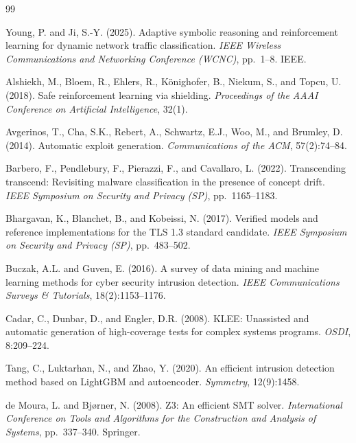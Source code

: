 \documentclass[12pt, letterpaper, oneside]{report}
\begin{document}

\begin{thebibliography}{99}

Young, P. and Ji, S.-Y. (2025).
Adaptive symbolic reasoning and reinforcement learning for dynamic network traffic classification.
\textit{IEEE Wireless Communications and Networking Conference (WCNC)}, pp.\ 1--8. IEEE.

Alshiekh, M., Bloem, R., Ehlers, R., K{\"o}nighofer, B., Niekum, S., and Topcu, U. (2018).
Safe reinforcement learning via shielding.
\textit{Proceedings of the AAAI Conference on Artificial Intelligence}, 32(1).

Avgerinos, T., Cha, S.K., Rebert, A., Schwartz, E.J., Woo, M., and Brumley, D. (2014).
Automatic exploit generation.
\textit{Communications of the ACM}, 57(2):74--84.

Barbero, F., Pendlebury, F., Pierazzi, F., and Cavallaro, L. (2022).
Transcending transcend: Revisiting malware classification in the presence of concept drift.
\textit{IEEE Symposium on Security and Privacy (SP)}, pp.\ 1165--1183.

Bhargavan, K., Blanchet, B., and Kobeissi, N. (2017).
Verified models and reference implementations for the TLS 1.3 standard candidate.
\textit{IEEE Symposium on Security and Privacy (SP)}, pp.\ 483--502.

Buczak, A.L. and Guven, E. (2016).
A survey of data mining and machine learning methods for cyber security intrusion detection.
\textit{IEEE Communications Surveys \& Tutorials}, 18(2):1153--1176.

Cadar, C., Dunbar, D., and Engler, D.R. (2008).
KLEE: Unassisted and automatic generation of high-coverage tests for complex systems programs.
\textit{OSDI}, 8:209--224.

Tang, C., Luktarhan, N., and Zhao, Y. (2020).
An efficient intrusion detection method based on LightGBM and autoencoder.
\textit{Symmetry}, 12(9):1458.

de Moura, L. and Bj{\o}rner, N. (2008).
Z3: An efficient SMT solver.
\textit{International Conference on Tools and Algorithms for the Construction and Analysis of Systems}, pp.\ 337--340. Springer.


\end{thebibliography}
\end{document}
